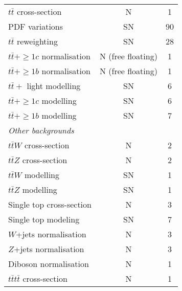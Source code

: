 \begin{table}[htbp]
\begin{tabular}{lcc}
  \hspace{2ex}$t\bar t$ cross-section           &   N   & 1  \\
  \hspace{2ex} PDF variations                   &  SN  & 90   \\
  \hspace{2ex}$t\bar t$ reweighting             &   SN  & 28  \\
  \hspace{2ex}$t\bar t +\ge 1c$ normalisation   &   N (free floating) & 1 \\
  \hspace{2ex}$t\bar t +\ge 1b$ normalisation   &   N (free floating) & 1 \\
  \hspace{2ex}$t\bar t +$ light modelling       &  SN  &  6  \\
  \hspace{2ex}$t\bar t +\ge 1c$  modelling      &  SN  &  6  \\
  \hspace{2ex}$t\bar t +\ge 1b$  modelling      &  SN  &  7  \\
  \midrule
  \multicolumn{3}{l}{\textit{Other backgrounds}} \\
  \hspace{2ex}$t\bar{t}W$ cross-section		    &   N  &  2  \\
  \hspace{2ex}$t\bar{t}Z$ cross-section		    &   N  &  2  \\
  \hspace{2ex}$t\bar{t}W$ modelling			    &  SN  &  1  \\
  \hspace{2ex}$t\bar{t}Z$ modelling			    &  SN  &  1  \\
  \hspace{2ex}Single top cross-section		    &   N  &  3  \\
  \hspace{2ex}Single top modeling			    &  SN  &  7  \\
  \hspace{2ex}$W$+jets normalisation		    &   N  &  3  \\
  \hspace{2ex}$Z$+jets normalisation		    &   N  &  3  \\
  \hspace{2ex}Diboson normalisation			    &   N  &  1  \\
  \hspace{2ex}$t\bar{t}t\bar{t}$ cross-section	&   N  &  1  \\

\end{tabular}
\end{table}
